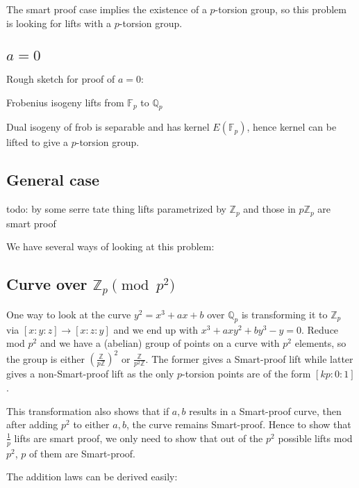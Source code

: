 \documentclass{article}
\newcommand{\mb}
{\mathbb}
\begin{document}
The smart proof case implies the existence of a $p$-torsion group, so this problem is looking for lifts with a $p$-torsion group.

\subsection{$a=0$}

Rough sketch for proof of $a=0$:

Frobenius isogeny lifts from $\mb F_p$ to $\mb Q_p$

Dual isogeny of frob is separable and has kernel $E\left(\mb F_p\right)$, hence kernel can be lifted to give a $p$-torsion group.

\subsection{General case}

todo: by some serre tate thing lifts parametrized by $\mb Z_p$ and those in $p\mb Z_p$ are smart proof

\iffalse

We have several ways of looking at this problem:

\subsection{Curve over $\mb Z_p\pmod{p^2}$}

One way to look at the curve $y^2=x^3+ax+b$ over $\mb Q_p$ is transforming it to $\mb Z_p$ via $[x:y:z]\to[x:z:y]$ and we end up with $x^3+axy^2+by^3-y=0$. Reduce mod $p^2$ and we have a (abelian) group of points on a curve with $p^2$ elements, so the group is either $\left(\frac{\mb Z}{p\mb Z}\right)^2$ or $\frac{\mb Z}{p^2\mb Z}$. The former gives a Smart-proof lift while latter gives a non-Smart-proof lift as the only $p$-torsion points are of the form $[kp:0:1]$.

This transformation also shows that if $a,b$ results in a Smart-proof curve, then after adding $p^2$ to either $a,b$, the curve remains Smart-proof. Hence to show that $\frac1p$ lifts are smart proof, we only need to show that out of the $p^2$ possible lifts mod $p^2$, $p$ of them are Smart-proof.

The addition laws can be derived easily:
\end{document}
